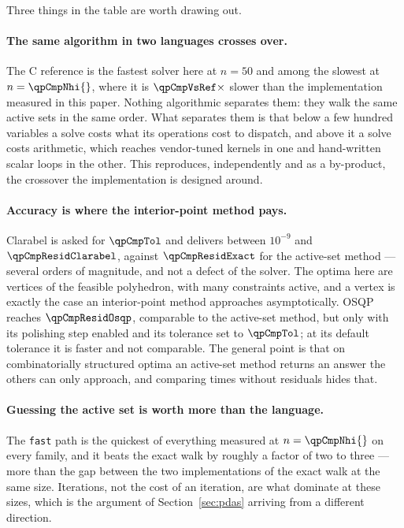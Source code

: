 Three things in the table are worth drawing out.

\paragraph{The same algorithm in two languages crosses over.} The C reference is
the fastest solver here at $n = 50$ and among the slowest at
$n = \qpCmpNhi{}$, where it is $\qpCmpVsRef\times$ slower than the
implementation measured in this paper. Nothing algorithmic separates them: they
walk the same active sets in the same order. What separates them is that below a
few hundred variables a solve costs what its operations cost to dispatch, and
above it a solve costs arithmetic, which reaches vendor-tuned kernels in one and
hand-written scalar loops in the other. This reproduces, independently and as a
by-product, the crossover the implementation is designed around.

\paragraph{Accuracy is where the interior-point method pays.} Clarabel is asked
for $\qpCmpTol$ and delivers between $10^{-9}$ and
$\qpCmpResidClarabel$, against $\qpCmpResidExact$ for the active-set method ---
several orders of magnitude, and not a defect of the solver. The optima here are
vertices of the feasible polyhedron, with many constraints active, and a vertex is
exactly the case an interior-point method approaches asymptotically. OSQP reaches
$\qpCmpResidOsqp$, comparable to the active-set method, but only with its
polishing step enabled and its tolerance set to $\qpCmpTol$; at its default
tolerance it is faster and not comparable. The general point is that on
combinatorially structured optima an active-set method returns an answer the
others can only approach, and comparing times without residuals hides that.

\paragraph{Guessing the active set is worth more than the language.} The
\texttt{fast} path is the quickest of everything measured at
$n = \qpCmpNhi{}$ on every family, and it beats the exact walk by roughly a
factor of two to three --- more than the gap between the two implementations of the
exact walk at the same size. Iterations, not the cost of an iteration, are what
dominate at these sizes, which is the argument of Section~\ref{sec:pdas} arriving
from a different direction.

